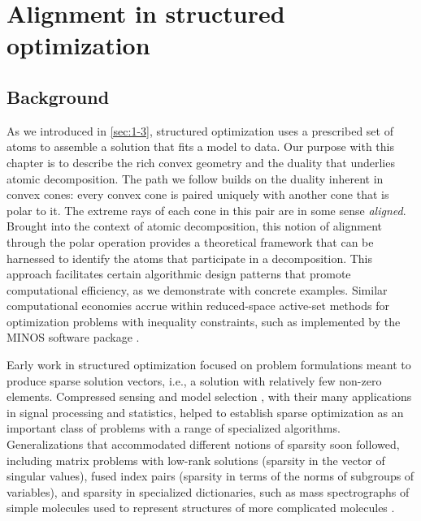 \chapter{Alignment in structured optimization}
\label{ch:Dual-Struc-Opt}

\section{Background}
As we introduced in \autoref{sec:1-3}, structured optimization uses a prescribed set of atoms to assemble a solution that fits a model to data. Our purpose with this chapter is to describe the rich convex geometry and the duality that
underlies atomic decomposition. The path we follow builds on the duality
inherent in convex cones: every convex cone is paired uniquely with another cone that is polar to it. The extreme rays of each cone in this pair are in some sense \emph{aligned}. Brought into the context of atomic decomposition, this
notion of alignment through the polar operation provides a theoretical framework
that can be harnessed to identify the atoms that participate in a decomposition. This
approach facilitates certain algorithmic design patterns that promote
computational efficiency, as we demonstrate with concrete examples. Similar
computational economies accrue within reduced-space active-set methods for
optimization problems with inequality constraints, such as implemented by the
MINOS software package \citep{murtsaun:1983}.

Early work in structured optimization focused on problem formulations meant to
produce sparse solution vectors, i.e., a solution with relatively few non-zero
elements. Compressed sensing \cite{cds98,chendonosaun:2001,crt06a} and model
selection \cite{tibshirani1996regression,tibshirani1997lasso} , with their many applications
in signal processing and statistics, helped to establish sparse optimization as
an important class of problems with a range of specialized algorithms.
Generalizations that accommodated different notions of sparsity soon followed,
including matrix problems with low-rank solutions (sparsity in the vector of
singular values), fused index pairs (sparsity in terms of the norms of subgroups of variables), and sparsity in specialized dictionaries, such as mass
spectrographs of simple molecules used to represent structures of
more complicated molecules \cite[Section~6.3.1]{vandenberghe:2010}.

